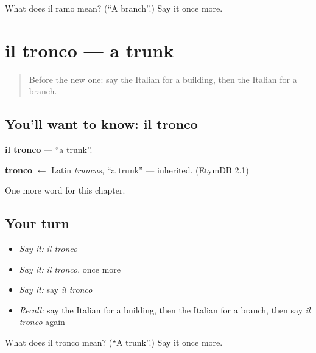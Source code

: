 \begin{tcolorbox}[breakable,colback=teal!4,colframe=teal!35!black,title={Before you move on}]
What does il ramo mean? (\textquotedblleft{}A branch\textquotedblright{}.) Say it once more.
\end{tcolorbox}
\section[il tronco]{il tronco — a trunk}

\label{lesson:IT-C200-tronco}



\begin{quote}
Before the new one: say the Italian for a building, then the Italian for a branch.
\end{quote}

\subsection*{You'll want to know: il tronco}
\textbf{il tronco} — \textquotedblleft{}a trunk\textquotedblright{}.

\begin{cousinweb}
\textbf{tronco} $\leftarrow$ Latin \emph{truncus}, \textquotedblleft{}a trunk\textquotedblright{} — inherited. (EtymDB 2.1)
\end{cousinweb}

\begin{grammarlens}[title={What you've built}]
One more word for this chapter.
\end{grammarlens}

\subsection*{Your turn}
\begin{itemize}
\raggedright
  \item \emph{Say it:} \emph{il tronco}
  \item \emph{Say it:} \emph{il tronco}, once more
  \item \emph{Say it:} say \emph{il tronco}
  \item \emph{Recall:} say the Italian for a building, then the Italian for a branch, then say \emph{il tronco} again
\end{itemize}

\begin{tcolorbox}[breakable,colback=teal!4,colframe=teal!35!black,title={Before you move on}]
What does il tronco mean? (\textquotedblleft{}A trunk\textquotedblright{}.) Say it once more.
\end{tcolorbox}
